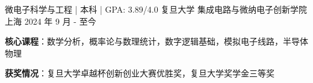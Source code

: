 

\begin{cventries}

  \cventry
  {微电子科学与工程 | 本科 | GPA: 3.89/4.0} %
  {复旦大学 集成电路与微纳电子创新学院} %
  {上海} %
  {2024 年 9 月 - 至今} %
  {
    \begin{cvitems} %
      \item {\textbf{核心课程}：数学分析，概率论与数理统计，数字逻辑基础，模拟电子线路，半导体物理}
      \item {\textbf{获奖情况}：复旦大学卓越杯创新创业大赛优胜奖，复旦大学奖学金三等奖}
    \end{cvitems}
  }

\end{cventries}
